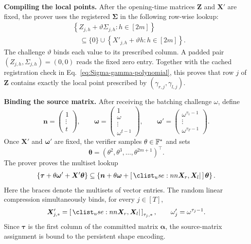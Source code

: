 \mysmallskip\noindent
\textbf{Compiling the local points.}
After the opening-time matrices $\bm Z$ and $\bm X'$ are fixed, the prover
uses the registered $\bm\Sigma$ in the following row-wise lookup:
\begin{equation}
\label{eq:coordinate-lookup}
\begin{aligned}
&
\left\{
Z_{j,h}+\vartheta\Sigma_{j,h}
:
h\in[2m]
\right\}\\
&\quad\subseteq
\{0\}
\cup
\left\{
X'_{j,h}+\vartheta h
:
h\in[2m]
\right\}.
\end{aligned}
\end{equation}
The challenge $\vartheta$ binds each value to its prescribed column.
A padded pair $(Z_{j,h},\Sigma_{j,h})=(0,0)$ reads the fixed zero entry.
Together with the cached registration check in
Eq.~\eqref{eq:Sigma-gamma-polynomial}, this proves that row $j$ of
$\bm Z$ contains exactly the local point prescribed by
$(\gamma_{r,j},\gamma_{l,j})$.

\mysmallskip\noindent
\textbf{Binding the source matrix.}
After receiving the batching challenge $\omega$, define
\[
\bm n=
\begin{pmatrix}
1\\[-1mm]
\vdots\\[-1mm]
t
\end{pmatrix},
\qquad
\bm\omega=
\begin{pmatrix}
1\\[-1mm]
\omega\\[-1mm]
\vdots\\[-1mm]
\omega^{t-1}
\end{pmatrix},
\qquad
\bm\omega'=
\begin{pmatrix}
\omega^{\tau_1-1}\\[-1mm]
\vdots\\[-1mm]
\omega^{\tau_T-1}
\end{pmatrix}.
\]
Once $\bm X'$ and $\bm\omega'$ are fixed, the verifier samples
$\theta\in{\mathbb{F}}^*$ and sets
\[
    \bm\theta
    =
    (\theta^2,\theta^3,\ldots,\theta^{2m+1})^\top.
\]
The prover proves the multiset lookup
\begin{equation}
\label{eq:source-row-lookup}
\begin{aligned}
\left\{
\bm\tau+\theta\bm\omega'
+\bm X'\bm\theta
\right\}
\subseteq
\left\{
\bm n+\theta\bm\omega
+\concat{\bm X_r,\bm X_l}\bm\theta
\right\}.
\end{aligned}
\end{equation}
Here the braces denote the multisets of vector entries.
The random linear compression simultaneously binds, for every $j\in[T]$,
\[
    \bm X'_{j,*}
    =
    \concat{\bm X_r,\bm X_l}_{\tau_j,*},
    \qquad
    \omega'_j
    =
    \omega^{\tau_j-1}.
\]
Since $\bm\tau$ is the first column of the committed matrix $\bm\alpha$,
the source-matrix assignment is bound to the persistent shape encoding.

